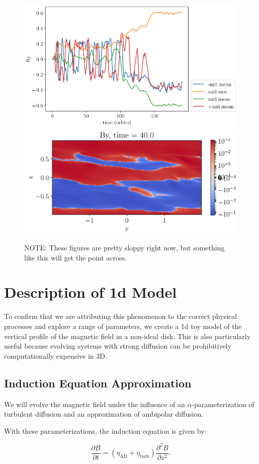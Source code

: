 \begin{figure}[p]
\centering
\includegraphics[width=0.5\columnwidth]{figs/figsChapter5/3D/By_vs_time.png}
\includegraphics[width=0.5\columnwidth]{figs/figsChapter5/3D/xyPlaneBy.png}
\caption{NOTE: These figures are pretty sloppy right now, but something like this will get the point across.}
\label{3dPlots}
\end{figure}





\section{Description of 1d Model}
To confirm that we are attributing this phenomenon to the correct physical processes and explore a range of parameters, we create a 1d toy model of the vertical profile of the magnetic field in a non-ideal disk.  This is also particularly useful because evolving systems with strong diffusion can be prohibitively computationally expensive in 3D.  


\subsection{Induction Equation Approximation}
We will evolve the magnetic field under the influence of an $\alpha$-parameterization of turbulent diffusion and an approximation of ambipolar diffusion.  

With these parameterizations, the induction equation is given by:

\begin{equation}
\frac{\partial B}{\partial t} = (\eta_{\text{AD}} + \eta_{\text{turb}}) \frac{\partial^2 B}{\partial z^2}.  \end{equation}

